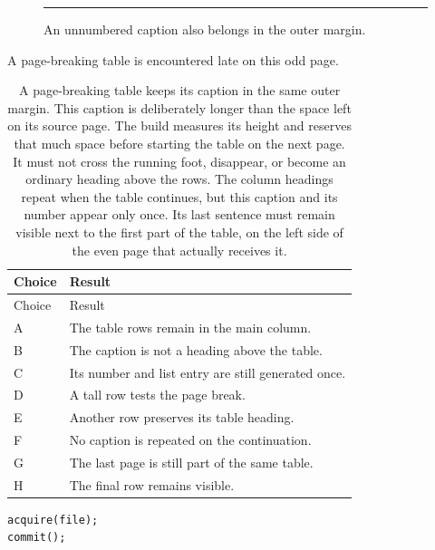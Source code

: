 \clearpage
\begin{figure}[htbp]
\centering\rule{120pt}{40pt}
\caption*{An unnumbered caption also belongs in the outer margin.}
\end{figure}
\clearpage
\noindent A page-breaking table is encountered late on this odd page.
\par\vspace*{380pt}
\begin{xltabular}{\textwidth}{@{}lX@{}}
\caption{A page-breaking table keeps its caption in the same outer margin.
This caption is deliberately longer than the space left on its source page.
The build measures its height and reserves that much space before starting
the table on the next page. It must not cross the running foot, disappear,
or become an ordinary heading above the rows. The column headings repeat
when the table continues, but this caption and its number appear only once.
Its last sentence must remain visible next to the first part of the table,
on the left side of the even page that actually receives it.}
\label{fixture:longtable}\\
\toprule Choice & Result\\\midrule
\endfirsthead
\toprule Choice & Result\\\midrule
\endhead
\bottomrule\endlastfoot
A & \rule{0pt}{80pt}The table rows remain in the main column.\\
B & \rule{0pt}{80pt}The caption is not a heading above the table.\\
C & \rule{0pt}{80pt}Its number and list entry are still generated once.\\
D & \rule{0pt}{80pt}A tall row tests the page break.\\
E & \rule{0pt}{80pt}Another row preserves its table heading.\\
F & \rule{0pt}{80pt}No caption is repeated on the continuation.\\
G & \rule{0pt}{80pt}The last page is still part of the same table.\\
H & \rule{0pt}{80pt}The final row remains visible.\\
\end{xltabular}
\clearpage
\begin{lstlisting}[caption={A short code listing still reserves its entire margin caption, even when the description is taller than its two lines of code.},label={fixture:listing}]
acquire(file);
commit();
\end{lstlisting}
